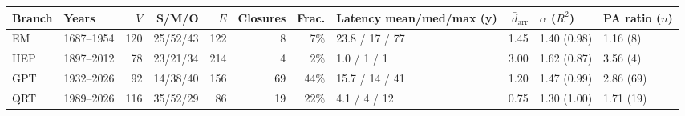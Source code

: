 \begin{tabular}{@{}llrrrrrlrll@{}}\toprule
Branch & Years & $V$ & S/M/O & $E$ & Closures & Frac. & Latency mean/med/max (y) & $\bar d_{\mathrm{arr}}$ & $\alpha$ ($R^2$) & PA ratio ($n$) \\\midrule
EM & 1687--1954 & 120 & 25/52/43 & 122 & 8 & 7\% & 23.8 / 17 / 77 & 1.45 & 1.40 (0.98) & 1.16 (8) \\
HEP & 1897--2012 & 78 & 23/21/34 & 214 & 4 & 2\% & 1.0 / 1 / 1 & 3.00 & 1.62 (0.87) & 3.56 (4) \\
GPT & 1932--2026 & 92 & 14/38/40 & 156 & 69 & 44\% & 15.7 / 14 / 41 & 1.20 & 1.47 (0.99) & 2.86 (69) \\
QRT & 1989--2026 & 116 & 35/52/29 & 86 & 19 & 22\% & 4.1 / 4 / 12 & 0.75 & 1.30 (1.00) & 1.71 (19) \\
\bottomrule\end{tabular}
